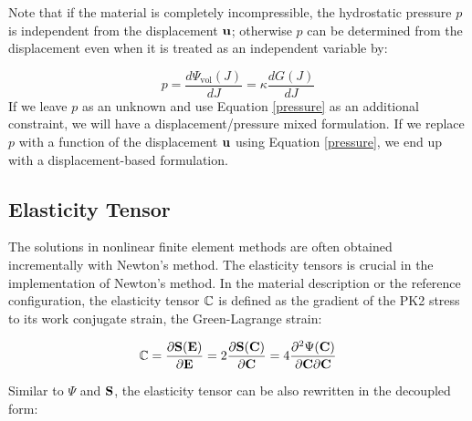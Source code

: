Note that if the material is completely incompressible, the hydrostatic pressure $p$ is independent from the displacement $\bold{u}$; otherwise $p$ can be determined from the displacement even when it is treated as an independent variable by:

\begin{equation} \label{pressure}
p = \frac{d\Psi_\mathrm{vol}(J)}{dJ} = \kappa\frac{dG(J)}{dJ}
\end{equation}
If we leave $p$ as an unknown and use Equation \ref{pressure} as an additional constraint, we will have a displacement/pressure mixed formulation. If we replace $p$ with a function of the displacement $\bold{u}$ using Equation \ref{pressure}, we end up with a displacement-based formulation.

%
\subsection{Elasticity Tensor} \label{general_elasticity}
The solutions in nonlinear finite element methods are often obtained incrementally with Newton's method. The elasticity tensors is crucial in the implementation of Newton's method.
In the material description or the reference configuration, the elasticity tensor $\mathbb{C}$ is defined as the gradient of the PK2 stress to its work conjugate strain, the Green-Lagrange strain:

\begin{equation}
\mathbb{C} = \frac{\partial{\bold{S}(\bold{E})}}{\partial{\bold{E}}} =  2\frac{\partial{\bold{S}(\bold{C})}} {\partial{\bold{C}}} = 4 \frac{\partial^2{\Psi(\bold{C})}}{{\partial{\bold{C}}}{\partial{\bold{C}}}} \label{def_elasticity_tensor}
\end{equation}

Similar to $\Psi$ and $\bold{S}$, the elasticity tensor can be also rewritten in the decoupled form: 

